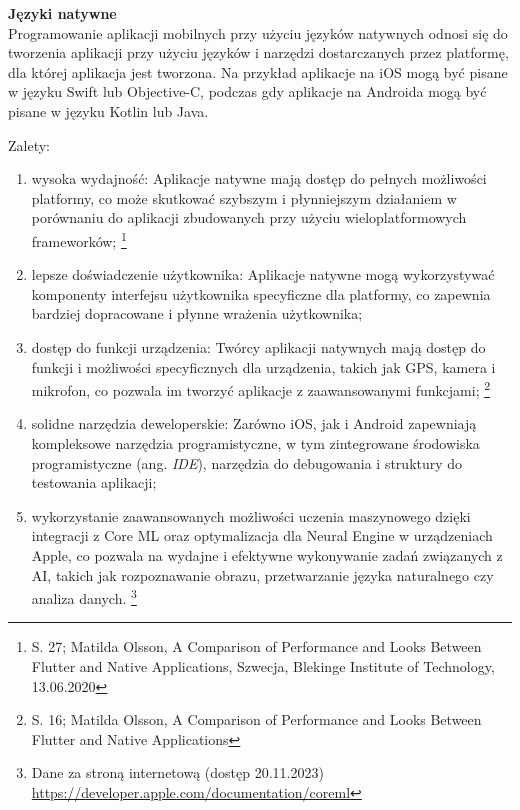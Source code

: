 \documentclass[12pt, a4paper, twoside, openany]{book}
\begin{document}
\textbf{Języki natywne\\}
\indent Programowanie aplikacji mobilnych przy użyciu języków natywnych odnosi się do tworzenia aplikacji przy użyciu języków i narzędzi dostarczanych przez platformę, dla której aplikacja jest tworzona. Na przykład aplikacje na iOS mogą być pisane w języku Swift lub Objective-C, podczas gdy aplikacje na Androida mogą być pisane w języku Kotlin lub Java.

Zalety:
\begin{enumerate}[label=--]
    \item wysoka wydajność: Aplikacje natywne mają dostęp do pełnych możliwości platformy, co może skutkować szybszym i płynniejszym działaniem w porównaniu do aplikacji zbudowanych przy użyciu wieloplatformowych frameworków; \footnote{S. 27; Matilda Olsson, A Comparison of Performance and Looks Between Flutter and Native Applications, Szwecja, Blekinge Institute of Technology, 13.06.2020}
    \item lepsze doświadczenie użytkownika: Aplikacje natywne mogą wykorzystywać komponenty interfejsu użytkownika specyficzne dla platformy, co zapewnia bardziej dopracowane i płynne wrażenia użytkownika;
    \item dostęp do funkcji urządzenia: Twórcy aplikacji natywnych mają dostęp do funkcji i możliwości specyficznych dla urządzenia, takich jak GPS, kamera i mikrofon, co pozwala im tworzyć aplikacje z zaawansowanymi funkcjami; \footnote{S. 16; Matilda Olsson, A Comparison of Performance and Looks Between Flutter and Native Applications}
    \item solidne narzędzia deweloperskie: Zarówno iOS, jak i Android zapewniają kompleksowe narzędzia programistyczne, w tym zintegrowane środowiska programistyczne (ang. \textit{IDE}), narzędzia do debugowania i struktury do testowania aplikacji;
    \item wykorzystanie zaawansowanych możliwości uczenia maszynowego dzięki integracji z Core ML oraz optymalizacja dla Neural Engine w urządzeniach Apple, co pozwala na wydajne i efektywne wykonywanie zadań związanych z AI, takich jak rozpoznawanie obrazu, przetwarzanie języka naturalnego czy analiza danych. \footnote{ Dane za stroną internetową (dostęp 20.11.2023) \url{https://developer.apple.com/documentation/coreml} }
\end{enumerate}
\end{document}
